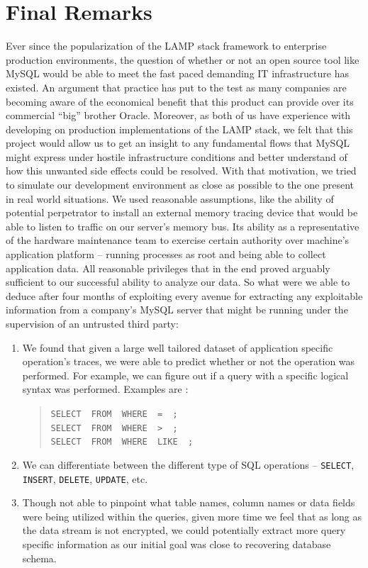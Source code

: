 \documentclass[11pt, oneside]{article}
\begin{document}
\section{Final Remarks}
Ever since the popularization of the LAMP stack framework to enterprise 
production environments, the question of whether or not an open source tool 
like MySQL would be able to meet the fast paced demanding IT infrastructure 
has existed. An argument that practice has put to the test as many companies 
are becoming aware of the economical benefit that this product can provide 
over its commercial “big” brother Oracle. Moreover, as both of us have 
experience with developing on production implementations of the LAMP stack, we 
felt that this project would allow us to get an insight to any fundamental 
flows that MySQL might express under hostile infrastructure conditions and 
better understand of how this unwanted side effects could be resolved. With 
that motivation, we tried to simulate our development environment as close as 
possible to the one present in real world situations. We used reasonable 
assumptions, like the ability of potential perpetrator to install an external 
memory tracing device that would be able to listen to traffic on our server's 
memory bus. Its ability as a representative of the hardware maintenance team 
to exercise certain authority over machine's application platform – running 
processes as root and being able to collect application data. All reasonable 
privileges that in the end proved arguably sufficient to our successful 
ability to analyze our data.
So what were we able to deduce after four months of exploiting every avenue 
for extracting any exploitable information from a company's MySQL server that 
might be running under the supervision of an untrusted third party:

\begin{enumerate}
\item We found that given a large well tailored dataset of application 
specific operation's traces, we were able to predict whether or not the 
operation was performed. For example, we can figure out if a query with a 
specific logical syntax was performed. Examples are :
\def\smalldash{\underbar{\hskip .3in}~}
\begin{quote}
{\tt SELECT \smalldash FROM \smalldash WHERE \smalldash = \smalldash;} \\
{\tt SELECT \smalldash FROM \smalldash WHERE \smalldash > \smalldash;} \\
{\tt SELECT \smalldash FROM \smalldash WHERE \smalldash LIKE \smalldash;}
\end{quote}
\item We can differentiate between the different type of SQL operations – 
{\tt SELECT}, {\tt INSERT}, {\tt DELETE}, {\tt UPDATE}, etc.
      
\item Though not able to pinpoint what table names, column names or data 
fields were being utilized within the queries, given more time we feel that as 
long as the data stream is not encrypted, we could potentially extract more 
query specific information as our initial goal was close to recovering 
database schema.
\end{enumerate}
\end{document}
